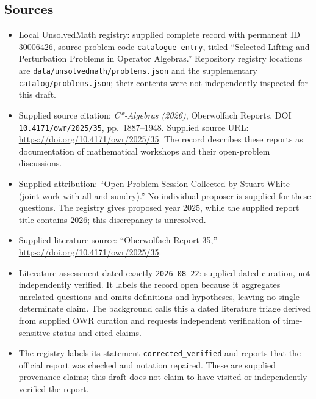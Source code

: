 \documentclass[11pt]{article}
\begin{document}
\subsection{Sources}
\begin{itemize}
\item Local UnsolvedMath registry: supplied complete record with permanent ID \(30006426\), source problem code \texttt{catalogue entry}, titled ``Selected Lifting and Perturbation Problems in Operator Algebras.'' Repository registry locations are \texttt{data/unsolvedmath/problems.json} and the supplementary \texttt{catalog/problems.json}; their contents were not independently inspected for this draft.
\item Supplied source citation: \emph{C*-Algebras (2026)}, Oberwolfach Reports, DOI \texttt{10.4171/owr/2025/35}, pp.\ 1887--1948. Supplied source URL: \url{https://doi.org/10.4171/owr/2025/35}. The record describes these reports as documentation of mathematical workshops and their open-problem discussions.
\item Supplied attribution: ``Open Problem Session Collected by Stuart White (joint work with all and sundry).'' No individual proposer is supplied for these questions. The registry gives proposed year \(2025\), while the supplied report title contains \(2026\); this discrepancy is unresolved.
\item Supplied literature source: ``Oberwolfach Report 35,'' \url{https://doi.org/10.4171/owr/2025/35}.
\item Literature assessment dated exactly \texttt{2026-08-22}: supplied dated curation, not independently verified. It labels the record open because it aggregates unrelated questions and omits definitions and hypotheses, leaving no single determinate claim. The background calls this a dated literature triage derived from supplied OWR curation and requests independent verification of time-sensitive status and cited claims.
\item The registry labels its statement \texttt{corrected\_verified} and reports that the official report was checked and notation repaired. These are supplied provenance claims; this draft does not claim to have visited or independently verified the report.
\end{itemize}
\end{document}
